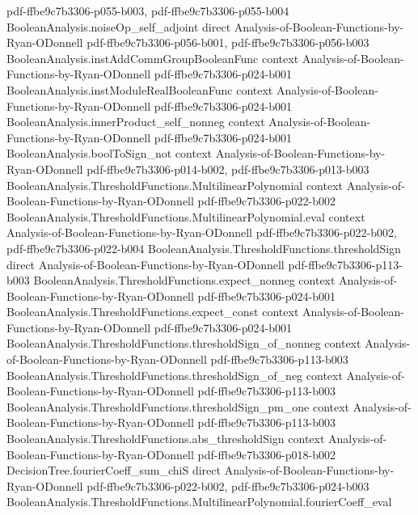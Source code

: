 \begin{lemma}
  {pdf-ffbe9c7b3306-p055-b003,
    pdf-ffbe9c7b3306-p055-b004}
\proofstep
  {BooleanAnalysis.noiseOp_self_adjoint}
  {direct}
  {Analysis-of-Boolean-Functions-by-Ryan-ODonnell}
  {pdf-ffbe9c7b3306-p056-b001,
    pdf-ffbe9c7b3306-p056-b003}
\proofstep
  {BooleanAnalysis.instAddCommGroupBooleanFunc}
  {context}
  {Analysis-of-Boolean-Functions-by-Ryan-ODonnell}
  {pdf-ffbe9c7b3306-p024-b001}
\proofstep
  {BooleanAnalysis.instModuleRealBooleanFunc}
  {context}
  {Analysis-of-Boolean-Functions-by-Ryan-ODonnell}
  {pdf-ffbe9c7b3306-p024-b001}
\proofstep
  {BooleanAnalysis.innerProduct_self_nonneg}
  {context}
  {Analysis-of-Boolean-Functions-by-Ryan-ODonnell}
  {pdf-ffbe9c7b3306-p024-b001}
\proofstep
  {BooleanAnalysis.boolToSign_not}
  {context}
  {Analysis-of-Boolean-Functions-by-Ryan-ODonnell}
  {pdf-ffbe9c7b3306-p014-b002,
    pdf-ffbe9c7b3306-p013-b003}
\proofstep
  {BooleanAnalysis.ThresholdFunctions.MultilinearPolynomial}
  {context}
  {Analysis-of-Boolean-Functions-by-Ryan-ODonnell}
  {pdf-ffbe9c7b3306-p022-b002}
\proofstep
  {BooleanAnalysis.ThresholdFunctions.MultilinearPolynomial.eval}
  {context}
  {Analysis-of-Boolean-Functions-by-Ryan-ODonnell}
  {pdf-ffbe9c7b3306-p022-b002,
    pdf-ffbe9c7b3306-p022-b004}
\proofstep
  {BooleanAnalysis.ThresholdFunctions.thresholdSign}
  {direct}
  {Analysis-of-Boolean-Functions-by-Ryan-ODonnell}
  {pdf-ffbe9c7b3306-p113-b003}
\proofstep
  {BooleanAnalysis.ThresholdFunctions.expect_nonneg}
  {context}
  {Analysis-of-Boolean-Functions-by-Ryan-ODonnell}
  {pdf-ffbe9c7b3306-p024-b001}
\proofstep
  {BooleanAnalysis.ThresholdFunctions.expect_const}
  {context}
  {Analysis-of-Boolean-Functions-by-Ryan-ODonnell}
  {pdf-ffbe9c7b3306-p024-b001}
\proofstep
  {BooleanAnalysis.ThresholdFunctions.thresholdSign_of_nonneg}
  {context}
  {Analysis-of-Boolean-Functions-by-Ryan-ODonnell}
  {pdf-ffbe9c7b3306-p113-b003}
\proofstep
  {BooleanAnalysis.ThresholdFunctions.thresholdSign_of_neg}
  {context}
  {Analysis-of-Boolean-Functions-by-Ryan-ODonnell}
  {pdf-ffbe9c7b3306-p113-b003}
\proofstep
  {BooleanAnalysis.ThresholdFunctions.thresholdSign_pm_one}
  {context}
  {Analysis-of-Boolean-Functions-by-Ryan-ODonnell}
  {pdf-ffbe9c7b3306-p113-b003}
\proofstep
  {BooleanAnalysis.ThresholdFunctions.abs_thresholdSign}
  {context}
  {Analysis-of-Boolean-Functions-by-Ryan-ODonnell}
  {pdf-ffbe9c7b3306-p018-b002}
\proofstep
  {DecisionTree.fourierCoeff_sum_chiS}
  {direct}
  {Analysis-of-Boolean-Functions-by-Ryan-ODonnell}
  {pdf-ffbe9c7b3306-p022-b002,
    pdf-ffbe9c7b3306-p024-b003}
\proofstep
  {BooleanAnalysis.ThresholdFunctions.MultilinearPolynomial.fourierCoeff_eval}

\end{lemma}
